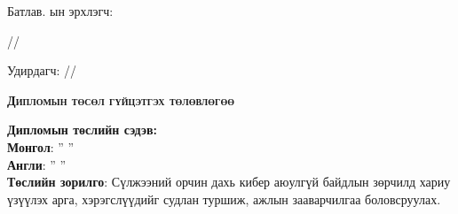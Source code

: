 
\begin{titlepage}
\noindent Батлав. \deptname ын эрхлэгч: 
\begin{flushright}
\makebox[6cm]{\dotfill} /\chairname/ 
\end{flushright} 
Удирдагч:\makebox[6cm]{ \dotfill} /\supname/
\begin{center}
\vspace*{0.5cm}
\textbf{{\large \textsc{Дипломын төсөл гүйцэтгэх төлөвлөгөө}}}\\[0.5cm]
\end{center}
\noindent \textbf{Дипломын төслийн сэдэв:}\\
\textbf{Монгол}: '' \ttitle '' \\
\textbf{Англи}: '' \ttitleng ''\\

\noindent \textbf{Төслийн зорилго}: Сүлжээний орчин дахь кибер аюулгүй байдлын зөрчилд хариу үзүүлэх арга, хэрэгслүүдийг судлан туршиж, ажлын зааварчилгаа боловсруулах.\\
 

\end{titlepage}
